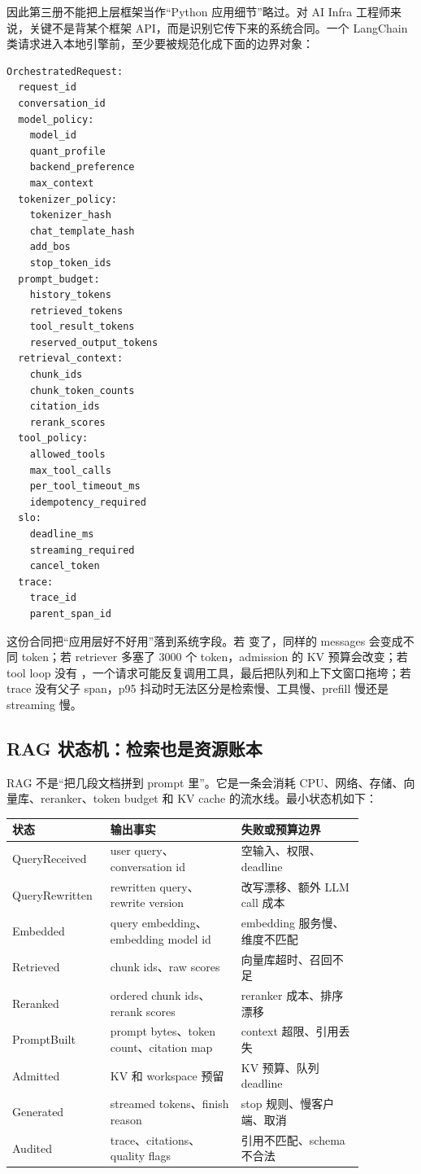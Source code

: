 因此第三册不能把上层框架当作“Python 应用细节”略过。对 AI Infra 工程师来说，关键不是背某个框架 API，而是识别它传下来的系统合同。一个 LangChain 类请求进入本地引擎前，至少要被规范化成下面的边界对象：

\begin{lstlisting}[numbers=none,caption={上层编排传给推理服务的最小合同}]
OrchestratedRequest:
  request_id
  conversation_id
  model_policy:
    model_id
    quant_profile
    backend_preference
    max_context
  tokenizer_policy:
    tokenizer_hash
    chat_template_hash
    add_bos
    stop_token_ids
  prompt_budget:
    history_tokens
    retrieved_tokens
    tool_result_tokens
    reserved_output_tokens
  retrieval_context:
    chunk_ids
    chunk_token_counts
    citation_ids
    rerank_scores
  tool_policy:
    allowed_tools
    max_tool_calls
    per_tool_timeout_ms
    idempotency_required
  slo:
    deadline_ms
    streaming_required
    cancel_token
  trace:
    trace_id
    parent_span_id
\end{lstlisting}

这份合同把“应用层好不好用”落到系统字段。若  变了，同样的 messages 会变成不同 token；若 retriever 多塞了 3000 个 token，admission 的 KV 预算会改变；若 tool loop 没有 ，一个请求可能反复调用工具，最后把队列和上下文窗口拖垮；若 trace 没有父子 span，p95 抖动时无法区分是检索慢、工具慢、prefill 慢还是 streaming 慢。

\subsection{RAG 状态机：检索也是资源账本}

RAG 不是“把几段文档拼到 prompt 里”。它是一条会消耗 CPU、网络、存储、向量库、reranker、token budget 和 KV cache 的流水线。最小状态机如下：

\begin{center}
\small
\begin{tabular}{p{0.20\linewidth}p{0.34\linewidth}p{0.32\linewidth}}
\toprule
状态 & 输出事实 & 失败或预算边界 \\
\midrule
QueryReceived & user query、conversation id & 空输入、权限、deadline \\
QueryRewritten & rewritten query、rewrite version & 改写漂移、额外 LLM call 成本 \\
Embedded & query embedding、embedding model id & embedding 服务慢、维度不匹配 \\
Retrieved & chunk ids、raw scores & 向量库超时、召回不足 \\
Reranked & ordered chunk ids、rerank scores & reranker 成本、排序漂移 \\
PromptBuilt & prompt bytes、token count、citation map & context 超限、引用丢失 \\
Admitted & KV 和 workspace 预留 & KV 预算、队列 deadline \\
Generated & streamed tokens、finish reason & stop 规则、慢客户端、取消 \\
Audited & trace、citations、quality flags & 引用不匹配、schema 不合法 \\
\bottomrule
\end{tabular}
\end{center}

